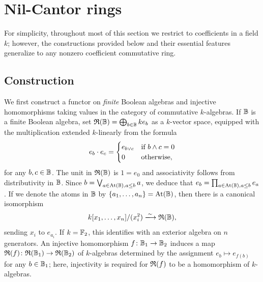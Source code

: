 \documentclass{amsart}
\begin{document}
    \section{Nil-Cantor rings}\label{sec:rings}
    
    
    For simplicity, throughout most of this section we restrict to coefficients in a field $k$; however, the constructions provided below and their essential features generalize to any nonzero coefficient commutative ring.  
    
    
    \subsection{Construction}\label{ssec:construction}
    
    We first construct a functor on \emph{finite} Boolean algebras and injective homomorphisms taking values in the category of commutative $k$-algebras. If $\mathbb{B}$ is a finite Boolean algebra, set $\mathfrak{R}(\mathbb{B}) = \bigoplus_{b \in \mathbb{B}}ke_b$ as a $k$-vector space, equipped with the multiplication extended $k$-linearly from the formula
        \begin{equation}\label{eq:multiplication}
            e_b\cdot e_c = 
                \begin{cases}
                    e_{b \lor c} & \text{if } b \land c = 0 \\
                    0 & \text{otherwise},
                \end{cases}
        \end{equation}
    for any $b,c \in \mathbb{B}$. The unit in $\mathfrak{R}(\mathbb{B})$ is $1 = e_0$ and associativity follows from distributivity in $\mathbb{B}$. Since $b = \bigvee_{a \in \operatorname{At}(\mathbb{B}), a \leq b}a$, we deduce that $e_b = \prod_{a \in \operatorname{At}(\mathbb{B}), a \leq b}e_a$. If we denote the atoms in $\mathbb{B}$ by $\{a_1,\ldots,a_n\} = \operatorname{At}(\mathbb{B})$, then there is a canonical isomorphism
        \begin{equation}\label{eq:finite-ring}
            k[x_1,\ldots,x_n]/(x_i^2) \xlongrightarrow{\sim} \R{\ba{B}},
    \end{equation}
    sending $x_i$ to $e_{a_i}$. If $k = \mathbb{F}_2$, this identifies with an exterior algebra on $n$ generators. An injective homomorphism $f\colon \mathbb{B}_1 \to \mathbb{B}_2$ induces a map $\mathfrak{R}(f)\colon \mathfrak{R}(\mathbb{B}_1) \to \mathfrak{R}(\mathbb{B}_2)$ of $k$-algebras determined by the assignment $e_b \mapsto e_{f(b)}$ for any $b \in \mathbb{B}_1$; here, injectivity is required for $\mathfrak{R}(f)$ to be a homomorphism of $k$-algebras.
    
\end{document}
